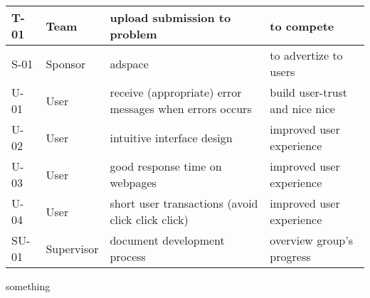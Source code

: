 \begin{longtable}{|p{}|p{}|p{}|p{}|}
\hline
T-01&Team&upload submission to problem&to compete\\
\hline
S-01&Sponsor&adspace&to advertize to users\\
\hline
U-01&User&receive (appropriate) error messages when errors occurs&build user-trust and nice nice\\
\hline
U-02&User&intuitive interface design&improved user experience\\
\hline
U-03&User&good response time on webpages&improved user experience\\
\hline
U-04&User&short user transactions (avoid click click click)&improved user experience\\
\hline
SU-01&Supervisor&document development process&overview group's progress\\
\hline
\end{longtable}

\newpage

something
